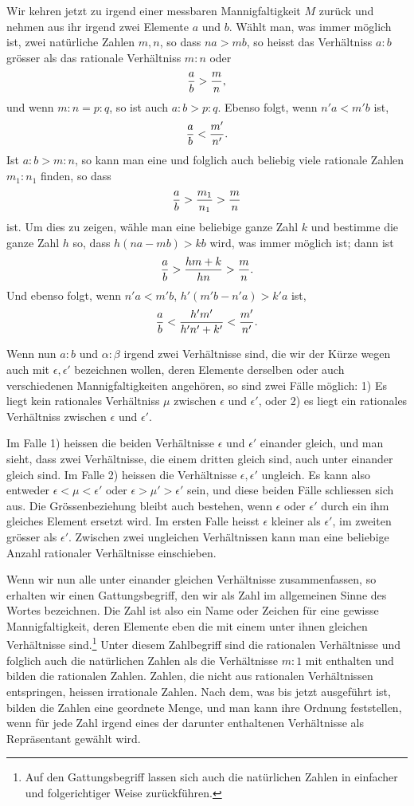 \documentclass[11pt]{article}
\begin{document}
Wir kehren jetzt zu irgend einer messbaren Mannigfaltigkeit $M$ zurück und nehmen aus ihr irgend zwei Elemente $a$ und $b$. Wählt man, was immer möglich ist, zwei natürliche Zahlen $m,n$, so dass $na>mb$, so heisst das Verhältniss $a:b$ grösser als das rationale Verhältniss $m:n$ oder
\[
 {a\over b}>{m\over n},
\]
und wenn $m:n=p:q$, so ist auch $a:b>p:q$. Ebenso folgt, wenn $n'a<m'b$ ist,
\[
 {a\over b}<{m'
\over n'}.
\]
Ist $a:b>m:n$, so kann man eine und folglich auch beliebig viele rationale Zahlen $m_1:n_1$ finden, so dass
\[
 {a\over b}>{m_1\over n_1}>{m\over n}
\]
ist. Um dies zu zeigen, wähle man eine beliebige ganze Zahl $k$ und bestimme die ganze Zahl $h$ so, dass $h(na-mb)>kb$ wird, was immer möglich ist; dann ist
\[
 {a\over b}>{hm+k\over hn}>{m\over n}.
\]
Und ebenso folgt, wenn $n'a<m'b$, $h'(m'b-n'a)>k'a$ ist,
\[
 {a\over b}<{h'm'
\over h'n'+k'}<{m'
\over n'}.
\]

Wenn nun $a:b$ und $\alpha:\beta$ irgend zwei Verhältnisse sind, die wir der Kürze wegen auch mit $\epsilon,\epsilon'$ bezeichnen wollen, deren Elemente derselben oder auch verschiedenen Mannigfaltigkeiten angehören, so sind zwei Fälle möglich: 1) Es liegt kein rationales Verhältniss $\mu$ zwischen $\epsilon$ und $\epsilon'$, oder 2) es liegt ein rationales Verhältniss zwischen $\epsilon$ und $\epsilon'$.

Im Falle 1) heissen die beiden Verhältnisse $\epsilon$ und $\epsilon'$ einander gleich, und man sieht, dass zwei Verhältnisse, die einem dritten gleich sind, auch unter einander gleich sind. Im Falle 2) heissen die Verhältnisse $\epsilon,\epsilon'$ ungleich. Es kann also entweder $\epsilon<\mu<\epsilon'$ oder $\epsilon>\mu'>\epsilon'$ sein, und diese beiden Fälle schliessen sich aus. Die Grössenbeziehung bleibt auch bestehen, wenn $\epsilon$ oder $\epsilon'$ durch ein ihm gleiches Element ersetzt wird. Im ersten Falle heisst $\epsilon$ kleiner als $\epsilon'$, im zweiten grösser als $\epsilon'$. Zwischen zwei ungleichen Verhältnissen kann man eine beliebige Anzahl rationaler Verhältnisse einschieben.

Wenn wir nun alle unter einander gleichen Verhältnisse zusammenfassen, so erhalten wir einen Gattungsbegriff, den wir als Zahl im allgemeinen Sinne des Wortes bezeichnen. Die Zahl ist also ein Name oder Zeichen für eine gewisse Mannigfaltigkeit, deren Elemente eben die mit einem unter ihnen gleichen Verhältnisse sind.\footnote{Auf den Gattungsbegriff lassen sich auch die natürlichen Zahlen in einfacher und folgerichtiger Weise zurückführen.} Unter diesem Zahlbegriff sind die rationalen Verhältnisse und folglich auch die natürlichen Zahlen als die Verhältnisse $m:1$ mit enthalten und bilden die rationalen Zahlen. Zahlen, die nicht aus rationalen Verhältnissen entspringen, heissen irrationale Zahlen. Nach dem, was bis jetzt ausgeführt ist, bilden die Zahlen eine geordnete Menge, und man kann ihre Ordnung feststellen, wenn für jede Zahl irgend eines der darunter enthaltenen Verhältnisse als Repräsentant gewählt wird.
\end{document}
